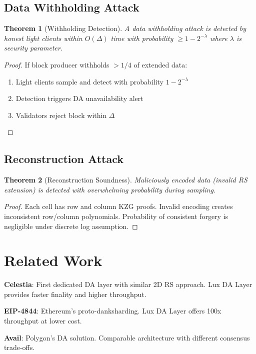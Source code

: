 \documentclass[11pt,a4paper]{article}
\newtheorem{theorem}{Theorem}
\begin{document}
\subsection{Data Withholding Attack}

\begin{theorem}[Withholding Detection]
A data withholding attack is detected by honest light clients within $O(\Delta)$ time with probability $\geq 1 - 2^{-\lambda}$ where $\lambda$ is security parameter.
\end{theorem}

\begin{proof}
If block producer withholds $> 1/4$ of extended data:
\begin{enumerate}
    \item Light clients sample and detect with probability $1 - 2^{-\lambda}$
    \item Detection triggers DA unavailability alert
    \item Validators reject block within $\Delta$
\end{enumerate}
\end{proof}

\subsection{Reconstruction Attack}

\begin{theorem}[Reconstruction Soundness]
Maliciously encoded data (invalid RS extension) is detected with overwhelming probability during sampling.
\end{theorem}

\begin{proof}
Each cell has row and column KZG proofs. Invalid encoding creates inconsistent row/column polynomials. Probability of consistent forgery is negligible under discrete log assumption.
\end{proof}

\section{Related Work}

\textbf{Celestia}: First dedicated DA layer with similar 2D RS approach. Lux DA Layer provides faster finality and higher throughput.

\textbf{EIP-4844}: Ethereum's proto-danksharding. Lux DA Layer offers 100x throughput at lower cost.

\textbf{Avail}: Polygon's DA solution. Comparable architecture with different consensus trade-offs.
\end{document}
